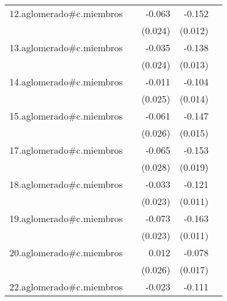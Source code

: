 {\begin{longtable}{l*{4}{D{.}{.}{-1}}}
\addlinespace
12.aglomerado#c.miembros&                     &      -0.063\sym{**} &      -0.152\sym{***}&                     \\
            &                     &     (0.024)         &     (0.012)         &                     \\
\addlinespace
13.aglomerado#c.miembros&                     &      -0.035         &      -0.138\sym{***}&                     \\
            &                     &     (0.024)         &     (0.013)         &                     \\
\addlinespace
14.aglomerado#c.miembros&                     &      -0.011         &      -0.104\sym{***}&                     \\
            &                     &     (0.025)         &     (0.014)         &                     \\
\addlinespace
15.aglomerado#c.miembros&                     &      -0.061\sym{*}  &      -0.147\sym{***}&                     \\
            &                     &     (0.026)         &     (0.015)         &                     \\
\addlinespace
17.aglomerado#c.miembros&                     &      -0.065\sym{*}  &      -0.153\sym{***}&                     \\
            &                     &     (0.028)         &     (0.019)         &                     \\
\addlinespace
18.aglomerado#c.miembros&                     &      -0.033         &      -0.121\sym{***}&                     \\
            &                     &     (0.023)         &     (0.011)         &                     \\
\addlinespace
19.aglomerado#c.miembros&                     &      -0.073\sym{**} &      -0.163\sym{***}&                     \\
            &                     &     (0.023)         &     (0.011)         &                     \\
\addlinespace
20.aglomerado#c.miembros&                     &       0.012         &      -0.078\sym{***}&                     \\
            &                     &     (0.026)         &     (0.017)         &                     \\
\addlinespace
22.aglomerado#c.miembros&                     &      -0.023         &      -0.111\sym{***}&                     \\

\end{longtable}}
